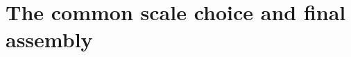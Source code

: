 \documentclass[11pt]{article}
\theoremstyle{remark}
\numberwithin{equation}{section}
\begin{document}
\section{The common scale choice and final assembly}









\end{document}

